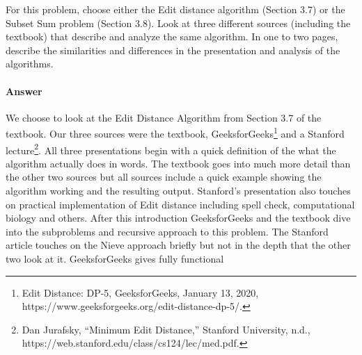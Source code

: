 \documentclass{article}
\begin{document}

\nextprob
{}

For this problem, choose either the Edit distance algorithm (Section 3.7) or the
Subset Sum problem (Section 3.8). Look at three different sources (including the
textbook) that describe
and analyze the same algorithm. In one to two pages, describe the similarities
and differences in the presentation and analysis of the algorithms.

\paragraph{Answer}


We choose to look at the Edit Distance Algorithm from Section 3.7 of the textbook. Our three sources were the textbook, GeeksforGeeks\footnote{Edit Distance: DP-5, GeeksforGeeks, January 13, 2020, https://www.geeksforgeeks.org/edit-distance-dp-5/.} and a Stanford lecture\footnote{Dan Jurafsky, “Minimum Edit Distance,” Stanford University, n.d., https://web.stanford.edu/class/cs124/lec/med.pdf.}. All  three presentations begin with a quick definition of the what the algorithm actually does in words. The textbook goes into much more detail than the other two sources but all sources include a quick example showing the algorithm working and the resulting output. Stanford's presentation also touches on practical implementation of Edit distance including spell check, computational biology and others. After this introduction GeeksforGeeks and the textbook dive into the subproblems and recursive approach to this problem. The Stanford article touches on the Nieve approach briefly but not in the depth that the other two look at it. GeeksforGeeks gives fully functional

\end{document}
